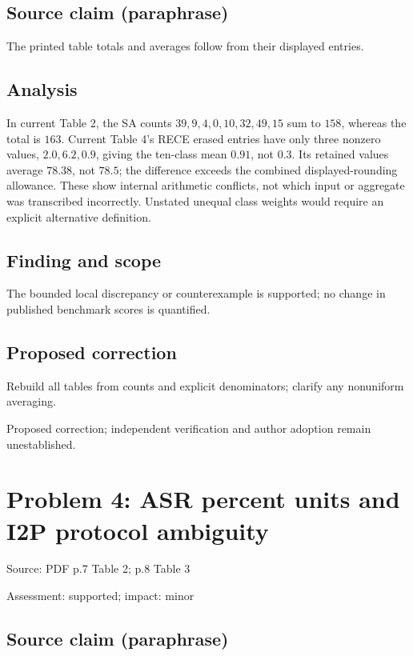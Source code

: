 \documentclass[11pt]{article}
\begin{document}
\subsection*{Source claim (paraphrase)}

The printed table totals and averages follow from their displayed entries.

\subsection*{Analysis}

In current Table 2, the SA counts \(39,9,4,0,10,32,49,15\) sum to \(158\), whereas the total is \(163\). Current Table 4’s RECE erased entries have only three nonzero values, \(2.0,6.2,0.9\), giving the ten-class mean \(0.91\), not \(0.3\). Its retained values average \(78.38\), not \(78.5\); the difference exceeds the combined displayed-rounding allowance. These show internal arithmetic conflicts, not which input or aggregate was transcribed incorrectly. Unstated unequal class weights would require an explicit alternative definition.

\subsection*{Finding and scope}

The bounded local discrepancy or counterexample is supported; no change in published benchmark scores is quantified.

\subsection*{Proposed correction}

Rebuild all tables from counts and explicit denominators; clarify any nonuniform averaging.

Proposed correction; independent verification and author adoption remain unestablished.

\section*{Problem 4: ASR percent units and I2P protocol ambiguity}

Source: PDF p.7 Table 2; p.8 Table 3

Assessment: supported; impact: minor

\subsection*{Source claim (paraphrase)}
\end{document}

